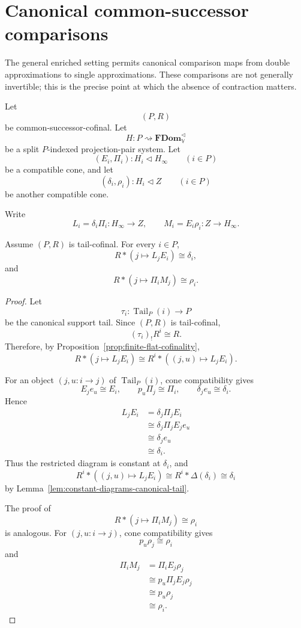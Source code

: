 \section{Canonical common-successor comparisons}
\label{sec:canonical-common-successor-comparisons}

The general enriched setting permits canonical comparison maps from double
approximations to single approximations.  These comparisons are not generally
invertible; this is the precise point at which the absence of contraction
matters.

Let
\[
    (P,R)
\]
be common-successor-cofinal.  Let
\[
    H:P\rightsquigarrow\mathbf{FDom}_{\mathbb V}^{\triangleleft}
\]
be a split \(P\)-indexed projection-pair system.  Let
\[
    (E_i,\Pi_i):H_i\triangleleft H_\infty
    \qquad(i\in P)
\]
be a compatible cone, and let
\[
    (\delta_i,\rho_i):H_i\triangleleft Z
    \qquad(i\in P)
\]
be another compatible cone.

Write
\[
    L_i=\delta_i\Pi_i:H_\infty\to Z,
    \qquad
    M_i=E_i\rho_i:Z\to H_\infty.
\]

\begin{lemma}
\label{lem:canonical-tail-restrictions}
Assume \((P,R)\) is tail-cofinal.  For every \(i\in P\),
\[
    R*(j\mapsto L_jE_i)
    \cong
    \delta_i,
\]
and
\[
    R*(j\mapsto \Pi_iM_j)
    \cong
    \rho_i.
\]
\end{lemma}

\begin{proof}
Let
\[
    \tau_i:\operatorname{Tail}_P(i)\to P
\]
be the canonical support tail.  Since \((P,R)\) is tail-cofinal,
\[
    (\tau_i)_!R^i\cong R.
\]
Therefore, by Proposition~\ref{prop:finite-flat-cofinality},
\[
    R*(j\mapsto L_jE_i)
    \cong
    R^i*((j,u)\mapsto L_jE_i).
\]

For an object \((j,u:i\to j)\) of \(\operatorname{Tail}_P(i)\), cone
compatibility gives
\[
    E_j e_u\cong E_i,
    \qquad
    p_u\Pi_j\cong \Pi_i,
    \qquad
    \delta_j e_u\cong \delta_i.
\]
Hence
\[
\begin{aligned}
    L_jE_i
    &=
    \delta_j\Pi_jE_i
    \\
    &\cong
    \delta_j\Pi_jE_j e_u
    \\
    &\cong
    \delta_j e_u
    \\
    &\cong
    \delta_i.
\end{aligned}
\]
Thus the restricted diagram is constant at \(\delta_i\), and
\[
    R^i*((j,u)\mapsto L_jE_i)
    \cong
    R^i*\Delta(\delta_i)
    \cong
    \delta_i
\]
by Lemma~\ref{lem:constant-diagrams-canonical-tail}.

The proof of
\[
    R*(j\mapsto \Pi_iM_j)
    \cong
    \rho_i
\]
is analogous.  For \((j,u:i\to j)\), cone compatibility gives
\[
    p_u\rho_j\cong \rho_i
\]
and
\[
\begin{aligned}
    \Pi_iM_j
    &=
    \Pi_iE_j\rho_j
    \\
    &\cong
    p_u\Pi_jE_j\rho_j
    \\
    &\cong
    p_u\rho_j
    \\
    &\cong
    \rho_i.
\end{aligned}
\]
\end{proof}

